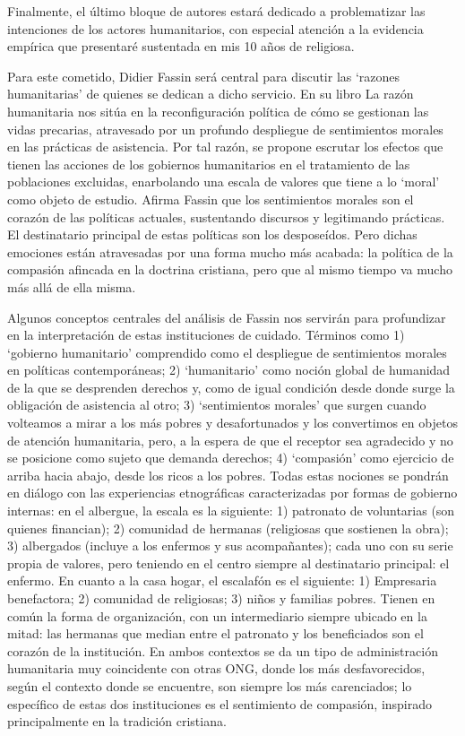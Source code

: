 \documentclass[
  spanish,
  11pt,
  a4paper,
]{scrbook}
\begin{document}
Finalmente, el último bloque de autores estará dedicado a problematizar
las intenciones de los actores humanitarios, con especial atención a la
evidencia empírica que presentaré sustentada en mis 10 años de
religiosa.

Para este cometido, Didier Fassin será central para discutir las
`razones humanitarias' de quienes se dedican a dicho servicio. En su
libro La razón humanitaria nos sitúa en la reconfiguración política de
cómo se gestionan las vidas precarias, atravesado por un profundo
despliegue de sentimientos morales en las prácticas de asistencia. Por
tal razón, se propone escrutar los efectos que tienen las acciones de
los gobiernos humanitarios en el tratamiento de las poblaciones
excluidas, enarbolando una escala de valores que tiene a lo `moral' como
objeto de estudio. Afirma Fassin que los sentimientos morales son el
corazón de las políticas actuales, sustentando discursos y legitimando
prácticas. El destinatario principal de estas políticas son los
desposeídos. Pero dichas emociones están atravesadas por una forma mucho
más acabada: la política de la compasión afincada en la doctrina
cristiana, pero que al mismo tiempo va mucho más allá de ella misma.

Algunos conceptos centrales del análisis de Fassin nos servirán para
profundizar en la interpretación de estas instituciones de cuidado.
Términos como 1) `gobierno humanitario' comprendido como el despliegue
de sentimientos morales en políticas contemporáneas; 2) `humanitario'
como noción global de humanidad de la que se desprenden derechos y, como
de igual condición desde donde surge la obligación de asistencia al
otro; 3) `sentimientos morales' que surgen cuando volteamos a mirar a
los más pobres y desafortunados y los convertimos en objetos de atención
humanitaria, pero, a la espera de que el receptor sea agradecido y no se
posicione como sujeto que demanda derechos; 4) `compasión' como
ejercicio de arriba hacia abajo, desde los ricos a los pobres. Todas
estas nociones se pondrán en diálogo con las experiencias etnográficas
caracterizadas por formas de gobierno internas: en el albergue, la
escala es la siguiente: 1) patronato de voluntarias (son quienes
financian); 2) comunidad de hermanas (religiosas que sostienen la obra);
3) albergados (incluye a los enfermos y sus acompañantes); cada uno con
su serie propia de valores, pero teniendo en el centro siempre al
destinatario principal: el enfermo. En cuanto a la casa hogar, el
escalafón es el siguiente: 1) Empresaria benefactora; 2) comunidad de
religiosas; 3) niños y familias pobres. Tienen en común la forma de
organización, con un intermediario siempre ubicado en la mitad: las
hermanas que median entre el patronato y los beneficiados son el corazón
de la institución. En ambos contextos se da un tipo de administración
humanitaria muy coincidente con otras ONG, donde los más desfavorecidos,
según el contexto donde se encuentre, son siempre los más carenciados;
lo específico de estas dos instituciones es el sentimiento de compasión,
inspirado principalmente en la tradición cristiana.
\end{document}
